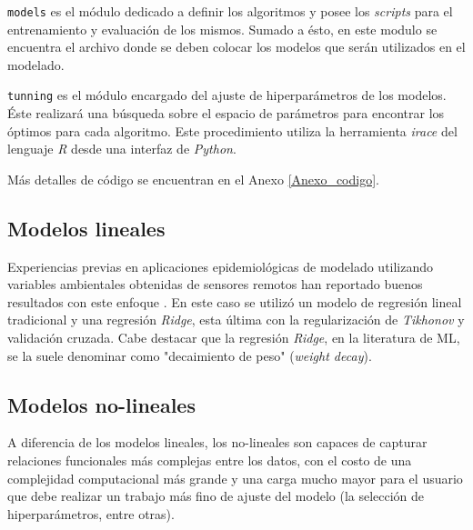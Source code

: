         \par \verb|models| es el módulo dedicado a definir los algoritmos y
          posee los \textit{scripts} para el entrenamiento y
          evaluación de los mismos. Sumado a ésto, en este modulo se encuentra
          el archivo donde se deben colocar los modelos que serán utilizados
          en el modelado.

        \par \verb|tunning| es el módulo encargado del ajuste de hiperparámetros
          de los modelos. Éste realizará una búsqueda sobre el espacio de
          parámetros para encontrar los óptimos para cada algoritmo. Este
          procedimiento utiliza la herramienta \textit{irace} del lenguaje
          \textit{R} desde una interfaz de \textit{Python}.

        \par Más detalles de código se encuentran en el Anexo \ref{Anexo_codigo}.



    \subsection{Modelos lineales}

      \par Experiencias previas en aplicaciones epidemiológicas de
        modelado utilizando variables ambientales obtenidas de sensores
        remotos han reportado buenos resultados con este
        enfoque \cite{akodon_modeling, multilinear_apli, modis_data}.
        En este caso se utilizó un modelo de regresión lineal tradicional y
        una regresión \textit{Ridge}, esta última con la regularización de
        \textit{Tikhonov} y validación cruzada. Cabe destacar que la
        regresión \textit{Ridge}, en la literatura de ML, se la suele denominar
        como "decaimiento de peso" (\textit{weight decay}).

  \subsection{Modelos no-lineales}

    \par A diferencia de los modelos lineales, los no-lineales son capaces de
      capturar relaciones funcionales más complejas entre los datos, con el costo
      de una complejidad computacional más grande y una carga mucho mayor para el
      usuario que debe realizar un trabajo más fino de ajuste del modelo (la
      selección de hiperparámetros, entre otras).

